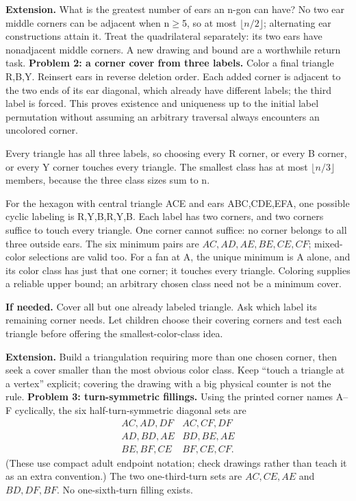\documentclass[11pt]{article}
\begin{document}
\textbf{Extension.} What is the greatest number of ears an n-gon can have? No two ear middle corners can be adjacent when n\(\geq\)5, so at most \(\lfloor n/2\rfloor\); alternating ear constructions attain it. Treat the quadrilateral separately: its two ears have nonadjacent middle corners. A new drawing and bound are a worthwhile return task.
\newpage
\textbf{Problem 2: a corner cover from three labels.} Color a final triangle R,B,Y. Reinsert ears in reverse deletion order. Each added corner is adjacent to the two ends of its ear diagonal, which already have different labels; the third label is forced. This proves existence and uniqueness up to the initial label permutation without assuming an arbitrary traversal always encounters an uncolored corner.

Every triangle has all three labels, so choosing every R corner, or every B corner, or every Y corner touches every triangle. The smallest class has at most \(\lfloor n/3\rfloor\) members, because the three class sizes sum to n.

For the hexagon with central triangle ACE and ears ABC,CDE,EFA, one possible cyclic labeling is R,Y,B,R,Y,B. Each label has two corners, and two corners suffice to touch every triangle. One corner cannot suffice: no corner belongs to all three outside ears. The six minimum pairs are \(AC,AD,AE,BE,CE,CF\); mixed-color selections are valid too. For a fan at A, the unique minimum is A alone, and its color class has just that one corner; it touches every triangle. Coloring supplies a reliable upper bound; an arbitrary chosen class need not be a minimum cover.

\textbf{If needed.} Cover all but one already labeled triangle. Ask which label its remaining corner needs. Let children choose their covering corners and test each triangle before offering the smallest-color-class idea.

\textbf{Extension.} Build a triangulation requiring more than one chosen corner, then seek a cover smaller than the most obvious color class. Keep ``touch a triangle at a vertex'' explicit; covering the drawing with a big physical counter is not the rule.
\newpage
\textbf{Problem 3: turn-symmetric fillings.} Using the printed corner names A–F cyclically, the six half-turn-symmetric diagonal sets are
\[
\begin{array}{ll}
AC,AD,DF&AC,CF,DF\\
AD,BD,AE&BD,BE,AE\\
BE,BF,CE&BF,CE,CF.
\end{array}
\]
(These use compact adult endpoint notation; check drawings rather than teach it as an extra convention.) The two one-third-turn sets are \(AC,CE,AE\) and \(BD,DF,BF\). No one-sixth-turn filling exists.
\end{document}
